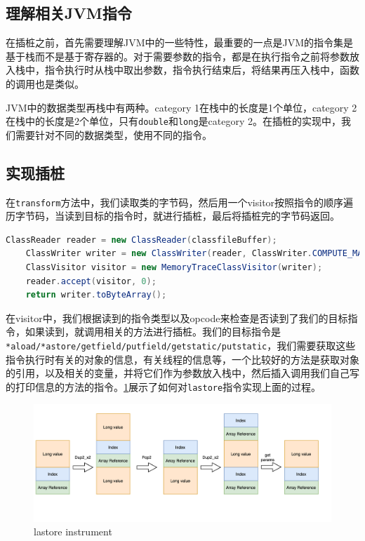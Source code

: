 \documentclass[UTF8]{ctexart}
\begin{document}
\subsection{理解相关JVM指令}
在插桩之前，首先需要理解JVM中的一些特性，最重要的一点是JVM的指令集是基于栈而不是基于寄存器的。对于需要参数的指令，都是在执行指令之前将参数放入栈中，指令执行时从栈中取出参数，指令执行结束后，将结果再压入栈中，函数的调用也是类似。

JVM中的数据类型再栈中有两种。category 1在栈中的长度是1个单位，category 2在栈中的长度是2个单位，只有\texttt{double}和\texttt{long}是category 2。在插桩的实现中，我们需要针对不同的数据类型，使用不同的指令。


\subsection{实现插桩}
在\texttt{transform}方法中，我们读取类的字节码，然后用一个visitor按照指令的顺序遍历字节码，当读到目标的指令时，就进行插桩，最后将插桩完的字节码返回。
\begin{lstlisting}[language=Java]
    ClassReader reader = new ClassReader(classfileBuffer);
    ClassWriter writer = new ClassWriter(reader, ClassWriter.COMPUTE_MAXS);
    ClassVisitor visitor = new MemoryTraceClassVisitor(writer);
    reader.accept(visitor, 0);
    return writer.toByteArray();
\end{lstlisting}
在visitor中，我们根据读到的指令类型以及opcode来检查是否读到了我们的目标指令，如果读到，就调用相关的方法进行插桩。我们的目标指令是\texttt{*aload/*astore/getfield/putfield/getstatic/putstatic}，我们需要获取这些指令执行时有关的对象的信息，有关线程的信息等，一个比较好的方法是获取对象的引用，以及相关的变量，并将它们作为参数放入栈中，然后插入调用我们自己写的打印信息的方法的指令。\ref{fig:lastore}展示了如何对\texttt{lastore}指令实现上面的过程。
\begin{figure}[htbp]
    \centering
    \includegraphics[width=5in]{lastore.png}
    \caption{lastore instrument}
    \label{fig:lastore}
\end{figure}
\end{document}
